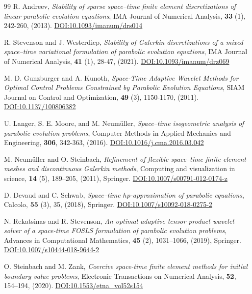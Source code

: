 \documentclass[review,11pt]{article}
\numberwithin{equation}{section}
\begin{document}
\begin{thebibliography}{99}
R. Andreev, \emph{Stability of sparse space--time finite element discretizations of linear parabolic evolution equations}, IMA Journal of Numerical Analysis, \textbf{33} (1), 242-260, (2013). \href{https://doi.org/10.1093/imanum/drs014}
{DOI:10.1093/imanum/drs014}

R. Stevenson and J. Westerdiep, \emph{Stability of {Galerkin} discretizations of a mixed space--time variational formulation of parabolic evolution equations}, IMA Journal of Numerical Analysis, \textbf{41} (1), 28-47, (2021). \href{https://doi.org/10.1093/imanum/drz069}{DOI:10.1093/imanum/drz069}


M. D. Gunzburger and A. Kunoth, \emph{Space-Time Adaptive Wavelet Methods for Optimal Control Problems Constrained by Parabolic Evolution Equations}, SIAM Journal on Control and Optimization, \textbf{49} (3), 1150-1170, (2011). \href{https://doi.org/10.1137/100806382}
{DOI:10.1137/100806382}

U. Langer, S. E. Moore, and M. Neum\"uller, \emph{Space--time isogeometric analysis of parabolic evolution problems}, Computer Methods in Applied Mechanics and Engineering, \textbf{306}, 342-363, (2016). \href{https://doi.org/10.1016/j.cma.2016.03.042}
{DOI:10.1016/j.cma.2016.03.042}

M. Neum{\"u}ller and O. Steinbach, \emph{Refinement of flexible space--time finite element meshes and discontinuous {Galerkin} methods}, Computing and visualization in science, \textbf{14} (5), 189--205, (2011), Springer. \href{https://doi.org/10.1007/s00791-012-0174-z}
{DOI:10.1007/s00791-012-0174-z}

D. Devaud and C. Schwab, \emph{Space--time $hp$-approximation of parabolic equations}, Calcolo, \textbf{55} (3), 35, (2018), Springer. \href{https://doi.org/10.1007/s10092-018-0275-2}
{DOI:10.1007/s10092-018-0275-2}


N. Rekatsinas and R. Stevenson, \emph{An optimal adaptive tensor product wavelet solver of a space-time {FOSLS} formulation of parabolic evolution problems}, Advances in Computational Mathematics, \textbf{45} (2), 1031--1066, (2019), Springer. \href{https://doi.org/10.1007/s10444-018-9644-2}
{DOI:10.1007/s10444-018-9644-2}


O. Steinbach and M. Zank, \emph{Coercive space-time finite element methods for initial boundary value problems}, Electronic Transactions on Numerical Analysis, \textbf{52}, 154--194, (2020). \href{https://doi.org/10.1553/etna_vol52s154}
{DOI:10.1553/etna\_vol52s154}



\end{thebibliography}
\end{document}
